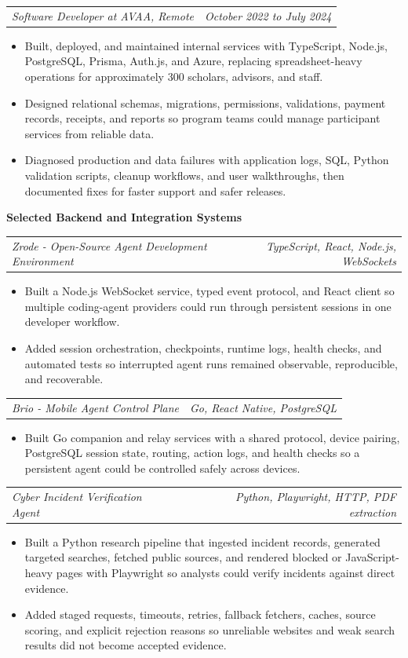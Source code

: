 \documentclass[10pt,letterpaper]{article}
\makeatletter
\newcommand{\bodyfont}{\fontsize{10.5}{15.75}\selectfont}
\newcommand{\sectiontitle}[1]{%
  \vspace{4pt}
  {\bodyfont\textbf{#1}}\par
  \nopagebreak[4]
  \vspace{2pt}
}
\newcommand{\roleline}[2]{%
  \begin{tabularx}{\textwidth}{@{}Xr@{}}
    \bodyfont\textit{#1} & \bodyfont\textit{#2}
  \end{tabularx}
  \nopagebreak[4]
  \vspace{1pt}
}
\makeatother
\begin{document}
\vspace{3pt}
\pagebreak
\roleline{Software Developer at AVAA, Remote}{October 2022 to July 2024}
\begin{itemize}
  \item Built, deployed, and maintained internal services with TypeScript, Node.js, PostgreSQL, Prisma, Auth.js, and Azure, replacing spreadsheet-heavy operations for approximately 300 scholars, advisors, and staff.
  \item Designed relational schemas, migrations, permissions, validations, payment records, receipts, and reports so program teams could manage participant services from reliable data.
  \item Diagnosed production and data failures with application logs, SQL, Python validation scripts, cleanup workflows, and user walkthroughs, then documented fixes for faster support and safer releases.
\end{itemize}

\sectiontitle{Selected Backend and Integration Systems}

\roleline{Zrode - Open-Source Agent Development Environment}{TypeScript, React, Node.js, WebSockets}
\begin{itemize}
  \item Built a Node.js WebSocket service, typed event protocol, and React client so multiple coding-agent providers could run through persistent sessions in one developer workflow.
  \item Added session orchestration, checkpoints, runtime logs, health checks, and automated tests so interrupted agent runs remained observable, reproducible, and recoverable.
\end{itemize}

\vspace{3pt}
\roleline{Brio - Mobile Agent Control Plane}{Go, React Native, PostgreSQL}
\begin{itemize}
  \item Built Go companion and relay services with a shared protocol, device pairing, PostgreSQL session state, routing, action logs, and health checks so a persistent agent could be controlled safely across devices.
\end{itemize}

\vspace{3pt}
\roleline{Cyber Incident Verification Agent}{Python, Playwright, HTTP, PDF extraction}
\begin{itemize}
  \item Built a Python research pipeline that ingested incident records, generated targeted searches, fetched public sources, and rendered blocked or JavaScript-heavy pages with Playwright so analysts could verify incidents against direct evidence.
  \item Added staged requests, timeouts, retries, fallback fetchers, caches, source scoring, and explicit rejection reasons so unreliable websites and weak search results did not become accepted evidence.
\end{itemize}
\end{document}
